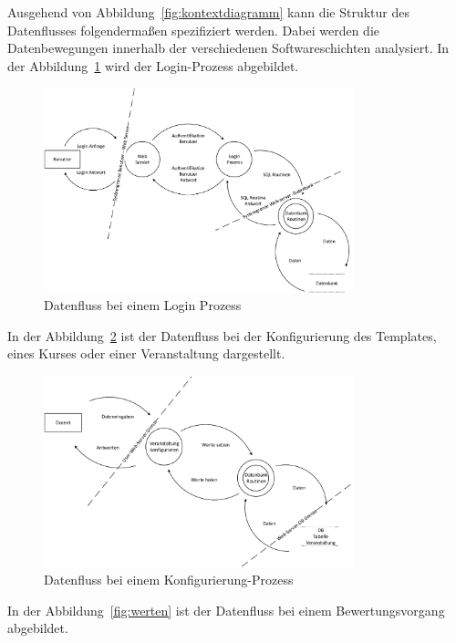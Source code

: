 \begin{appendix}
 Ausgehend von Abbildung~\ref{fig:kontextdiagramm} kann die Struktur des Datenflusses folgendermaßen spezifiziert werden. Dabei werden die Datenbewegungen innerhalb der verschiedenen Softwareschichten analysiert.
 In der Abbildung~\ref{fig:login} wird der Login-Prozess abgebildet.   
 
   \begin{figure}[ht]
  \centering
  \includegraphics[width=0.8\textwidth]{./img/dfd_login}
  \caption{Datenfluss bei einem Login Prozess}
  \label{fig:login}
  \end{figure}
  
  
  In der Abbildung~\ref{fig:config} ist der Datenfluss bei der Konfigurierung des Templates, eines Kurses oder einer Veranstaltung dargestellt.
  
      \begin{figure}[ht]
    \centering
    \includegraphics[width=0.8\textwidth]{./img/dfd_config}
    \caption{Datenfluss bei einem Konfigurierung-Prozess}
    \label{fig:config}
    \end{figure}
    \clearpage
  In der Abbildung~\ref{fig:werten} ist der Datenfluss bei einem Bewertungsvorgang abgebildet.
      

\end{appendix}
